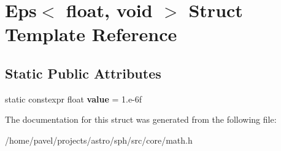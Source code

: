 \hypertarget{structEps_3_01float_00_01void_01_4}{}\section{Eps$<$ float, void $>$ Struct Template Reference}
\label{structEps_3_01float_00_01void_01_4}
\subsection*{Static Public Attributes}
\begin{DoxyCompactItemize}
\item 
\hypertarget{structEps_3_01float_00_01void_01_4_a493fd2f6a5555668a38cba3f06cf7095}{}\label{structEps_3_01float_00_01void_01_4_a493fd2f6a5555668a38cba3f06cf7095} 
static constexpr float {\bfseries value} = 1.e-\/6f
\end{DoxyCompactItemize}


The documentation for this struct was generated from the following file\+:\begin{DoxyCompactItemize}
\item 
/home/pavel/projects/astro/sph/src/core/math.\+h\end{DoxyCompactItemize}
